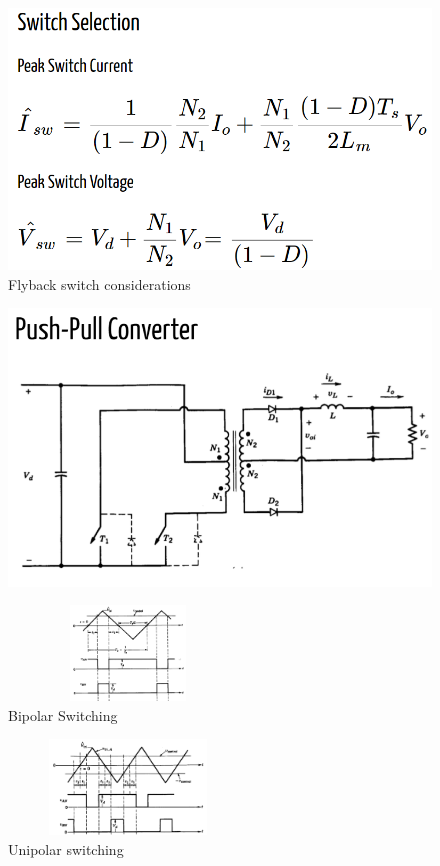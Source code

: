 \documentclass[twocolumn, ]{article}
\begin{document}
  \begin{figure}[!ht]
	\includegraphics[scale=0.30]{flybak_switch}
	\caption{Flyback switch considerations}
\end{figure}


  \begin{figure}[!ht]
	\includegraphics[scale=0.30]{pushpull}
\end{figure}

\begin{figure}[!ht]
	\includegraphics[width=2.5in,height=1in]{bipolar1.png}
	\caption{Bipolar Switching}
\end{figure}
\begin{figure}[!ht]
	\includegraphics[width=2.5in,height=1in]{unipolar1.png}
	\caption{Unipolar switching}
\end{figure}
\end{document}
